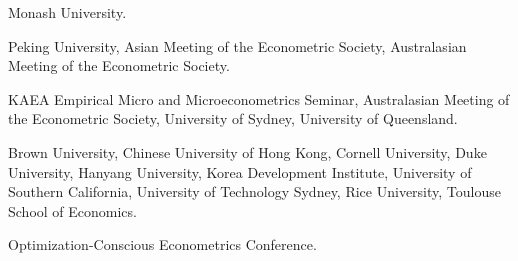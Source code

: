 \documentclass[10pt,letterpaper]{article}
\begin{document}
\begin{description}[font=\mdseries]
\item[2024]
  Monash University.
\item[2023]
  Peking University,
  Asian Meeting of the Econometric Society,
  Australasian Meeting of the Econometric Society.
\item[2022]
  KAEA Empirical Micro and Microeconometrics Seminar,
  Australasian Meeting of the Econometric Society,
  University of Sydney,
  University of Queensland.
\item[2020]
  Brown University,
  Chinese University of Hong Kong,
  Cornell University,
  Duke University,
  Hanyang University,
  Korea Development Institute,
  University of Southern California,
  University of Technology Sydney,
  Rice University,
  Toulouse School of Economics.
\item[2019]
  Optimization-Conscious Econometrics Conference.
\end{description}

%
\end{document}
